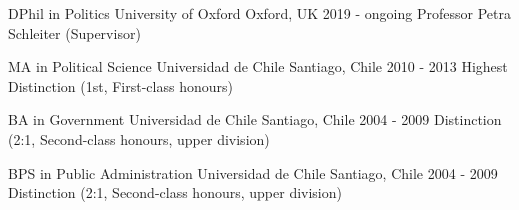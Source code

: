 





\begin{cventries}

\vspace{0.5mm}
\cventry
{DPhil in Politics} 
{University of Oxford} 
{Oxford, UK} 
{2019 - ongoing} 
{Professor Petra Schleiter (Supervisor)} \vspace{1.5mm}

\cventry
{MA in Political Science} 
{Universidad de Chile} 
{Santiago, Chile} 
{2010 - 2013} 
{Highest Distinction (1st, First-class honours)} \vspace{1.5mm}

\cventry
{BA in Government} 
{Universidad de Chile} 
{Santiago, Chile} 
{2004 - 2009} 
{Distinction (2:1, Second-class honours, upper division)} \vspace{1.5mm}

\cventry
{BPS in Public Administration} 
{Universidad de Chile} 
{Santiago, Chile} 
{2004 - 2009} 
{Distinction (2:1, Second-class honours, upper division)}\vspace{1.5mm}

\end{cventries}
